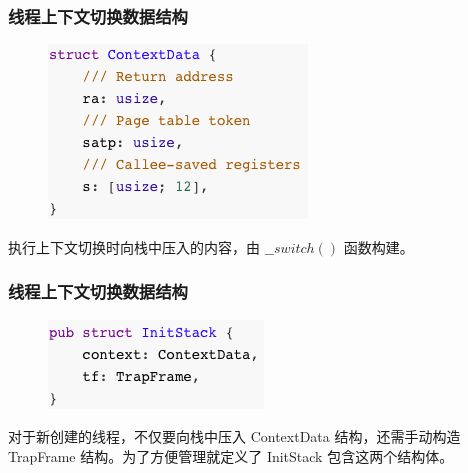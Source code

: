 \begin{frame}[fragile]
    \frametitle{线程上下文切换数据结构}
    \begin{figure}
    \includegraphics[width=0.55\linewidth]{figs/struct-ContextData.png}
    \end{figure}

执行上下文切换时向栈中压入的内容，由 $\_\_switch()$ 函数构建。

\end{frame}

% 
% 
% 

\begin{frame}[fragile]
    \frametitle{线程上下文切换数据结构}
    \begin{figure}
    \includegraphics[width=0.5\linewidth]{figs/struct-InitStack.png}
    \end{figure}

对于新创建的线程，不仅要向栈中压入 ContextData 结构，还需手动构造 TrapFrame 结构。为了方便管理就定义了 InitStack 包含这两个结构体。

\end{frame}

% 
% 
% 

